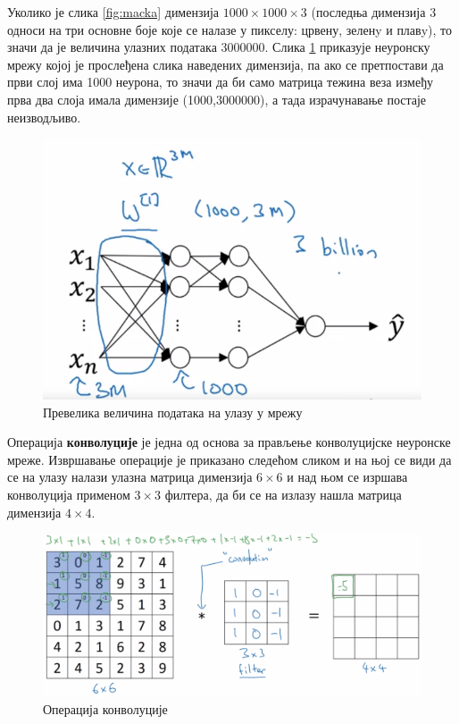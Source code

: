 \documentclass[12pt, а4paper]{article}
\begin{document}
Уколико је слика \ref{fig:macka} димензија $1000 \times 1000 \times 3$
(последња димензија 3 односи на три основне боје
које се налазе у пикселу: црвену, зеленy и плавy),
то значи да је величина улазних података 3000000.
\newpage
Слика \ref{fig:ng_FCVision}
приказује неуронску мрежу којој је прослеђена слика наведених димензија, па
ако се претпостави да први слој има 1000 неурона, то значи да би само матрица
тежина веза између прва два слоја имала димензије (1000,3000000), а тада израчунавање
постаје неизводљиво.

\begin{figure}[H]
  \centering
      \includegraphics[scale=0.45]{slike/ngFCVision.png}
  \caption{Превелика величина података на улазу у мрежу}
  \label{fig:ng_FCVision}
\end{figure}

Операција \textbf{конволуције} је једна од основа за прављење конволуцијске
неуронске мреже. Извршавање операције је приказано следећом сликом и на њој се
види да се на улазу налази улазна матрица димензија $6\times6$ и над њом
се изршава конволуција применом $3\times3$ филтера, да би се на излазу нашла матрица
димензија $4\times4$.

\begin{figure}[H]
  \centering
      \includegraphics[scale=0.35]{slike/ngKonvoucija.png}
  \caption{Операција конволуције}
  \label{fig:ng_Kovolucija}
\end{figure}
\end{document}
